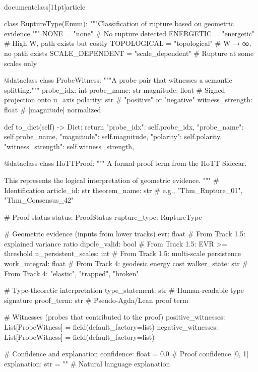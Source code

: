 \\documentclass[11pt]{article}
\begin{document}
\begin{CodeBlock}
class RuptureType(Enum):
    """Classification of rupture based on geometric evidence."""
    NONE = "none"                        # No rupture detected
    ENERGETIC = "energetic"              # High W, path exists but costly
    TOPOLOGICAL = "topological"          # W → ∞, no path exists
    SCALE_DEPENDENT = "scale_dependent"  # Rupture at some scales only


@dataclass
class ProbeWitness:
    """A probe pair that witnesses a semantic splitting."""
    probe_idx: int
    probe_name: str
    magnitude: float           # Signed projection onto u_axis
    polarity: str             # "positive" or "negative"
    witness_strength: float   # |magnitude| normalized

    def to_dict(self) -> Dict:
        return {
            "probe_idx": self.probe_idx,
            "probe_name": self.probe_name,
            "magnitude": self.magnitude,
            "polarity": self.polarity,
            "witness_strength": self.witness_strength,
        }


@dataclass
class HoTTProof:
    """
    A formal proof term from the HoTT Sidecar.

    This represents the logical interpretation of geometric evidence.
    """
    # Identification
    article_id: str
    theorem_name: str          # e.g., "Thm_Rupture_01", "Thm_Consensus_42"

    # Proof status
    status: ProofStatus
    rupture_type: RuptureType

    # Geometric evidence (inputs from lower tracks)
    evr: float                 # From Track 1.5: explained variance ratio
    dipole_valid: bool         # From Track 1.5: EVR >= threshold
    n_persistent_scales: int   # From Track 1.5: multi-scale persistence
    work_integral: float       # From Track 4: geodesic energy cost
    walker_state: str          # From Track 4: "elastic", "trapped", "broken"

    # Type-theoretic interpretation
    type_statement: str        # Human-readable type signature
    proof_term: str            # Pseudo-Agda/Lean proof term

    # Witnesses (probes that contributed to the proof)
    positive_witnesses: List[ProbeWitness] = field(default_factory=list)
    negative_witnesses: List[ProbeWitness] = field(default_factory=list)

    # Confidence and explanation
    confidence: float = 0.0    # Proof confidence [0, 1]
    explanation: str = ""      # Natural language explanation


\end{CodeBlock}
\end{document}

